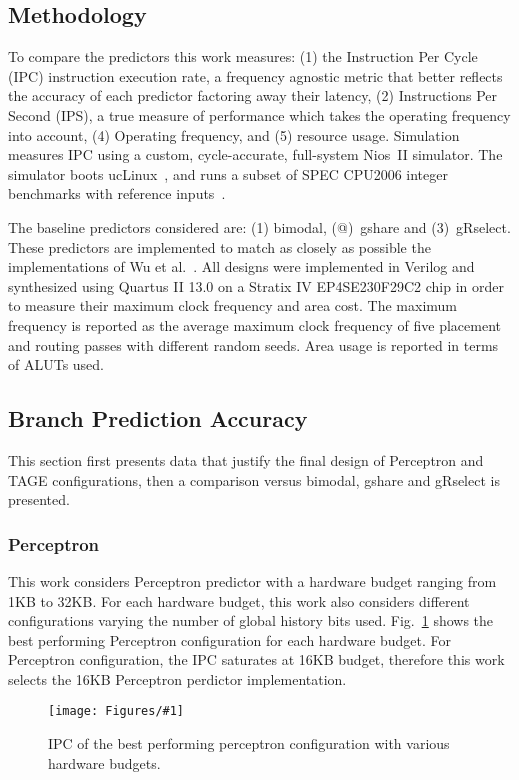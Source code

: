 \documentclass[conference]{IEEEtran}
\newcommand{\kfig}[4]{ %
        \begin{figure}[!t]
        \centering
        \texttt{[image: Figures/\#1]}
        \vspace{-1mm}
        \caption{#3}
        \label{#2}
        \end{figure}
}
\begin{document}
\subsection{Methodology}
\label{sec:eval:methodology}
To compare the predictors this work measures: (1) the Instruction Per Cycle (IPC) instruction execution rate, a frequency agnostic metric that better reflects the accuracy of each predictor factoring away their latency, (2) Instructions Per Second (IPS), a true measure of performance which takes the operating frequency into account, (4) Operating frequency, and (5) resource usage. Simulation measures IPC using a custom, cycle-accurate, full-system Nios~II simulator. The simulator boots ucLinux~\cite{uclinux}, and runs a subset of SPEC CPU2006 integer benchmarks with reference inputs~\cite{spec2k6}.

The baseline predictors considered are: (1) bimodal, (@)\ gshare and (3)\ gRselect. These predictors are implemented to match as closely as possible the implementations of Wu et al.~\cite{grselect}. All designs were implemented in Verilog and synthesized using Quartus II 13.0 on a Stratix IV EP4SE230F29C2 chip in order to measure their maximum clock frequency and area cost. The maximum frequency is reported as the average maximum clock frequency of five placement and routing passes with different random seeds. Area usage is reported in terms of ALUTs used.


\subsection{Branch Prediction Accuracy}
\label{sec:eval:ipc}
This section first presents data that justify the final design of Perceptron and TAGE configurations, then a comparison versus bimodal, gshare and gRselect is presented.

\subsubsection{Perceptron}
\label{sec:eval:ipc:perceptron}
This work considers Perceptron predictor with a hardware budget ranging from 1KB to 32KB. For each hardware budget, this work also considers different configurations varying the number of global history bits used. Fig.~\ref{fig:perceptronIPC} shows the best performing Perceptron configuration for each hardware budget. For Perceptron configuration, the IPC saturates at 16KB budget, therefore this work selects the 16KB Perceptron perdictor implementation.
\kfig{perceptronIPC.pdf}{fig:perceptronIPC}{IPC of the best performing perceptron configuration with various hardware budgets.}{angle = 0, trim = 0.9in 4in 0.8in 4.5in, clip, width=0.4\textwidth}
\end{document}

